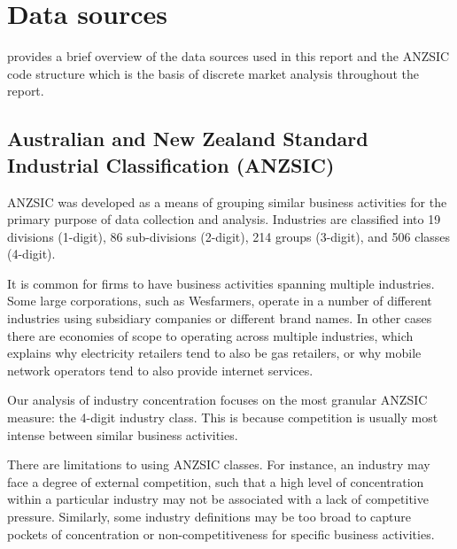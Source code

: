 \chapter{Data sources \label{chap:data_sources}}

 provides a brief overview of the data sources used in this report and the ANZSIC code structure which is the basis of discrete market analysis throughout the report.

\section{Australian and New Zealand Standard Industrial Classification (ANZSIC)}
ANZSIC was developed as a means of grouping similar business activities for the primary purpose of data collection and analysis. 
Industries are classified into 19 divisions (1-digit), 86 sub-divisions (2-digit), 214 groups (3-digit), and 506 classes (4-digit).

It is common for firms to have business activities spanning multiple industries.
Some large corporations, such as Wesfarmers, operate in a number of different industries using subsidiary companies or different brand names. 
In other cases there are economies of scope to operating across multiple industries, which explains why electricity retailers tend to also be gas retailers, or why mobile network operators tend to also provide internet services.

Our analysis of industry concentration focuses on the most granular ANZSIC measure: the 4-digit industry class. 
This is because competition is usually most intense between similar business activities.

There are limitations to using ANZSIC classes. 
For instance, an industry may face a degree of external competition, such that a high level of concentration within a particular industry may not be associated with a lack of competitive pressure. 
Similarly, some industry definitions may be too broad to capture pockets of concentration or non-competitiveness for specific business activities.

